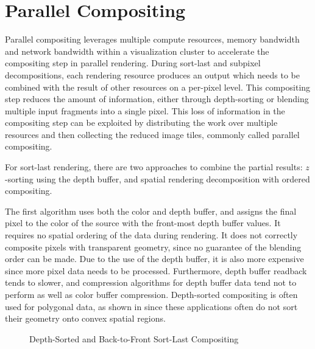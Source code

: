 \section{Parallel Compositing\label{sparcomp}}

Parallel compositing leverages multiple compute resources, memory bandwidth and
network bandwidth within a visualization cluster to accelerate the compositing
step in parallel rendering. During sort-last and subpixel decompositions, each
rendering resource produces an output which needs to be combined with the
result of other resources on a per-pixel level. This compositing step reduces
the amount of information, either through depth-sorting or blending multiple
input fragments into a single pixel. This loss of information in the
compositing step can be exploited by distributing the work over multiple
resources and then collecting the reduced image tiles, commonly called parallel
compositing.

For sort-last rendering, there are two approaches to combine the partial
results: $z$-sorting using the depth buffer, and spatial rendering
decomposition with ordered compositing.

The first algorithm uses both the color and depth buffer, and assigns the final
pixel to the color of the source with the front-most depth buffer values. It
requires no spatial ordering of the data during rendering. It does not
correctly composite pixels with transparent geometry, since no guarantee of the
blending order can be made. Due to the use of the depth buffer, it is also more
expensive since more pixel data needs to be processed. Furthermore, depth
buffer readback tends to slower, and compression algorithms for depth buffer
data tend not to perform as well as color buffer compression. Depth-sorted
compositing is often used for polygonal data, as shown in  since
these applications often do not sort their geometry onto convex spatial
regions.

\begin{figure}[h!t]\center
  \hfil
  \caption{Depth-Sorted and Back-to-Front Sort-Last Compositing}
\end{figure}

